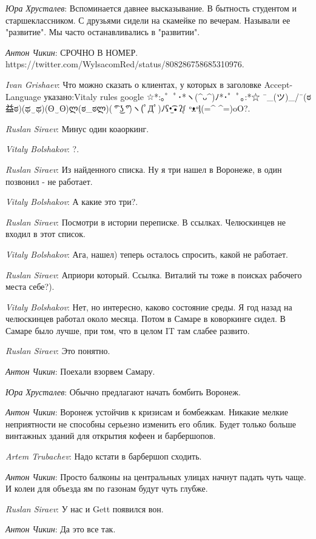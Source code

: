 \documentclass[10pt]{book}
\newcommand{\AUTHOR}[1]{\emph{#1}:}
\begin{document}
\AUTHOR{Юра Хрусталев} Вспоминается давнее высказывание. В бытность студентом и старшеклассником. С друзьями сидели на скамейке по вечерам. Называли ее "развитие". Мы часто останавливались в "развитии".

\AUTHOR{Антон Чикин} СРОЧНО В НОМЕР. https://twitter.com/WylsacomRed/status/808286758685310976.

\AUTHOR{Ivan Grishaev} Что можно сказать о клиентах, у которых в заголовке Accept-Language указано:Vitaly rules google ☆*:｡゜ﾟ･*ヽ(^ᴗ^)ﾉ*･゜ﾟ｡:*☆ ¯\_(ツ)_/¯(ಠ益ಠ)(ಥ‿ಥ)(ʘ‿ʘ)ლ(ಠ_ಠლ)( ͡° ͜ʖ ͡°)ヽ(ﾟДﾟ)ﾉʕ•̫͡•ʔᶘ ᵒᴥᵒᶅ(=^ ^=)oO?.

\AUTHOR{Ruslan Siraev} Минус один коаоркинг.

\AUTHOR{Vitaly Bolshakov} ?.

\AUTHOR{Ruslan Siraev} Из найденного списка. Ну я три нашел в Воронеже, в один позвонил - не работает.

\AUTHOR{Vitaly Bolshakov} А какие это три?.

\AUTHOR{Ruslan Siraev} Посмотри в истории переписке. В ссылках. Челюскинцев не входил в этот список.

\AUTHOR{Vitaly Bolshakov} Ага, нашел) теперь осталось спросить, какой не работает.

\AUTHOR{Ruslan Siraev} Априори который. Ссылка. Виталий ты тоже в поисках рабочего места себе?).

\AUTHOR{Vitaly Bolshakov} Нет, но интересно, каково состояние среды. Я год назад на челюскинцев работал около месяца. Потом в Самаре в коворкинге сидел. В Самаре было лучше, при том, что в целом IT там слабее развито.

\AUTHOR{Ruslan Siraev} Это понятно.

\AUTHOR{Антон Чикин} Поехали взорвем Самару.

\AUTHOR{Юра Хрусталев} Обычно предлагают начать бомбить Воронеж.

\AUTHOR{Антон Чикин} Воронеж устойчив к кризисам и бомбежкам. Никакие мелкие неприятности не способны серьезно изменить его облик. Будет только больше винтажных зданий для открытия кофеен и барбершопов.

\AUTHOR{Artem Trubachev} Надо кстати в барбершоп сходить.

\AUTHOR{Антон Чикин} Просто балконы на центральных улицах начнут падать чуть чаще. И колеи для объезда ям по газонам будут чуть глубже.

\AUTHOR{Ruslan Siraev} У нас и Gett появился вон.

\AUTHOR{Антон Чикин} Да это все так.
\end{document}
